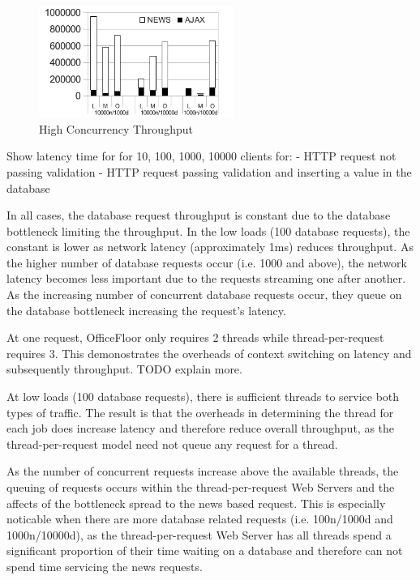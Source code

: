 \documentclass[conference]{ieee/IEEEtran}
\begin{document}
\begin{figure}[!t]
\centering 
\includegraphics[width=2.5in]{HighConcurrencyThroughput}
\caption{High Concurrency Throughput}
\label{fig:high_concurrency_throughput}
\end{figure}
  
Show latency time for for 10, 100, 1000, 10000 clients for:
        - HTTP request not passing validation
        - HTTP request passing validation and inserting a value in the database
       
In all cases, the database request throughput is constant due to the database
bottleneck limiting the throughput.  In the low loads (100 database requests),
the constant is lower as network latency (approximately 1ms) reduces
throughput.  As the higher number of database requests occur (i.e. 1000 and
above), the network latency becomes less important due to the requests
streaming one after another.  As the increasing number of concurrent database
requests occur, they queue on the database bottleneck increasing the request's
latency.
   
At one request, OfficeFloor only requires 2 threads while thread-per-request
requires 3.  This demonostrates the overheads of context switching on latency
and subsequently throughput.  TODO explain more.
       
At low loads (100 database requests), there is sufficient threads to service
both types of traffic.  The result is that the overheads in determining the
thread for each job does increase latency and therefore reduce overall
throughput, as the thread-per-request model need not queue any request for a
thread.
   
As the number of concurrent requests increase above the available threads, the
queuing of requests occurs within the thread-per-request Web Servers and the
affects of the bottleneck spread to the news based request.  This is especially
noticable when there are more database related requests (i.e. 100n/1000d and
1000n/10000d), as the thread-per-request Web Server has all threads spend a
significant proportion of their time waiting on a database and therefore can
not spend time servicing the news requests.
   
\end{document}

